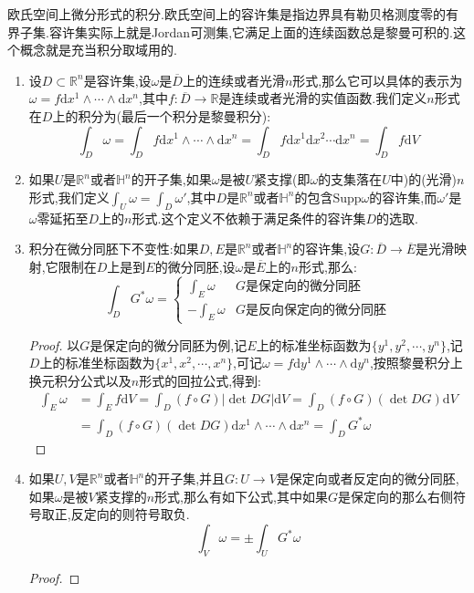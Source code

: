 欧氏空间上微分形式的积分.欧氏空间上的容许集是指边界具有勒贝格测度零的有界子集.容许集实际上就是Jordan可测集,它满足上面的连续函数总是黎曼可积的.这个概念就是充当积分取域用的.
\begin{enumerate}
	\item 设$D\subset\mathbb{R}^n$是容许集,设$\omega$是$\overline{D}$上的连续或者光滑$n$形式,那么它可以具体的表示为$\omega=f\mathrm{d}x^1\wedge\cdots\wedge\mathrm{d}x^n$,其中$f:\overline{D}\to\mathbb{R}$是连续或者光滑的实值函数.我们定义$n$形式在$D$上的积分为(最后一个积分是黎曼积分):
	$$\int_D\omega=\int_Df\mathrm{d}x^1\wedge\cdots\wedge\mathrm{d}x^n=\int_Df\mathrm{d}x^1\mathrm{d}x^2\cdots\mathrm{d}x^n=\int_Df\mathrm{d}V$$
	\item 如果$U$是$\mathbb{R}^n$或者$\mathbb{H}^n$的开子集,如果$\omega$是被$U$紧支撑(即$\omega$的支集落在$U$中)的(光滑)$n$形式,我们定义$\int_U\omega=\int_D\omega'$,其中$D$是$\mathbb{R}^n$或者$\mathbb{H}^n$的包含$\mathrm{Supp}\omega$的容许集,而$\omega'$是$\omega$零延拓至$D$上的$n$形式.这个定义不依赖于满足条件的容许集$D$的选取.
	\item 积分在微分同胚下不变性:如果$D,E$是$\mathbb{R}^n$或者$\mathbb{H}^n$的容许集,设$G:\overline{D}\to\overline{E}$是光滑映射,它限制在$D$上是到$E$的微分同胚,设$\omega$是$\overline{E}$上的$n$形式,那么:
	$$\int_DG^*\omega=\left\{\begin{array}{cc}\int_E\omega& G\text{是保定向的微分同胚}\\-\int_E\omega&G\text{是反向保定向的微分同胚}\end{array}\right.$$
	\begin{proof}
		
		以$G$是保定向的微分同胚为例,记$E$上的标准坐标函数为$\{y^1,y^2,\cdots,y^n\}$,记$D$上的标准坐标函数为$\{x^1,x^2,\cdots,x^n\}$,可记$\omega=f\mathrm{d}y^1\wedge\cdots\wedge\mathrm{d}y^n$,按照黎曼积分上换元积分公式以及$n$形式的回拉公式,得到:
		\begin{align*}
		\int_E\omega&=\int_Ef\mathrm{d}V=\int_D(f\circ G)|\det DG|\mathrm{d}V=\int_D(f\circ G)(\det DG)\mathrm{d}V\\&=\int_D(f\circ G)(\det DG)\mathrm{d}x^1\wedge\cdots\wedge\mathrm{d}x^n=\int_DG^*\omega
		\end{align*}
	\end{proof}
    \item 如果$U,V$是$\mathbb{R}^n$或者$\mathbb{H}^n$的开子集,并且$G:U\to V$是保定向或者反定向的微分同胚,如果$\omega$是被$V$紧支撑的$n$形式,那么有如下公式,其中如果$G$是保定向的那么右侧符号取正,反定向的则符号取负.$$\int_V\omega=\pm\int_UG^*\omega$$
    \begin{proof}
    	

\end{proof}
\end{enumerate}
